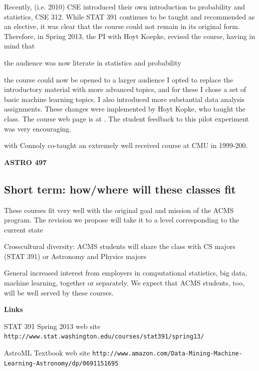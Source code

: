 Recently, (i.e. 2010) CSE introduced their own introduction to probability and statistics, CSE 312.  While STAT 391 continues to be taught and recommended as an elective, it was clear that the course could not remain in its original form.
Therefore, in Spring 2013, the PI \meila with Hoyt Koepke, revised the course, having in mind that
\bit
\item the audience was now literate in statistics and probability
\item the course could now be opened to a larger audience 
\eit
I opted to replace the introductory material with more advanced topics, and for these I chose a set of basic machine learning topics. I also introduced more substantial data analysis assignments. These changes were implemented by Hoyt Kopke, who taught the class. The course web page is at {\tt }. The student feedback to this pilot experiment was very encouraging. 

\meila with Connoly co-taught an extremely well received course at CMU in 1999-200. 

{\bf ASTRO 497}  

\subsection{Short term: how/where will these classes fit}
\bit
\item These courses fit very well with the original goal and mission of the  ACMS program. The revision we propose will take it to a level corresponding to the current state
\item Crosscultural diversity: ACMS students will share the class with CS majors (STAT 391) or Astronomy and Physics majors
\item General increased interest from employers in computational statistics, big data, machine learning, together or separately. We expect that ACMS students, too, will be well served by these courses.

\item[]{\bf Links}
\item STAT 391 Spring 2013 web site {\tt http://www.stat.washington.edu/courses/stat391/spring13/}
\item AstroML Textbook web site {\tt http://www.amazon.com/Data-Mining-Machine-Learning-Astronomy/dp/0691151695}
\eit


